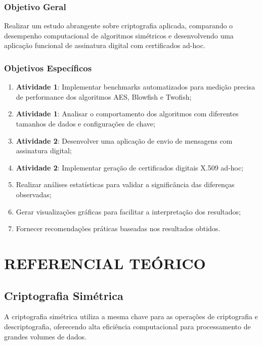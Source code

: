 \documentclass[12pt,a4paper,oneside]{article}
\begin{document}
\subsubsection{Objetivo Geral}

Realizar um estudo abrangente sobre criptografia aplicada, comparando o desempenho computacional de algoritmos simétricos e desenvolvendo uma aplicação funcional de assinatura digital com certificados ad-hoc.

\subsubsection{Objetivos Específicos}

\begin{enumerate}
    \item \textbf{Atividade 1}: Implementar benchmarks automatizados para medição precisa de performance dos algoritmos AES, Blowfish e Twofish;
    \item \textbf{Atividade 1}: Analisar o comportamento dos algoritmos com diferentes tamanhos de dados e configurações de chave;
    \item \textbf{Atividade 2}: Desenvolver uma aplicação de envio de mensagens com assinatura digital;
    \item \textbf{Atividade 2}: Implementar geração de certificados digitais X.509 ad-hoc;
    \item Realizar análises estatísticas para validar a significância das diferenças observadas;
    \item Gerar visualizações gráficas para facilitar a interpretação dos resultados;
    \item Fornecer recomendações práticas baseadas nos resultados obtidos.
\end{enumerate}

\section{REFERENCIAL TEÓRICO}

\subsection{Criptografia Simétrica}

A criptografia simétrica utiliza a mesma chave para as operações de criptografia e descriptografia, oferecendo alta eficiência computacional para processamento de grandes volumes de dados.
\end{document}
